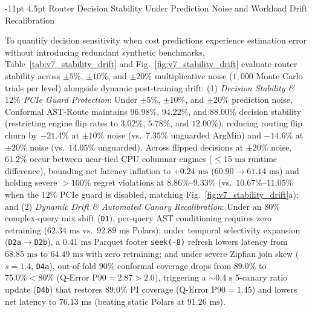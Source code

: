 \documentclass[10pt,a4paper]{article}
\makeatletter
\renewcommand\subsubsection{\@startsection{subsubsection}{3}{\z@}%
  {-11pt \@plus -2.5pt \@minus -1pt}%
  {4.5pt \@plus 1pt}%
  {\normalfont\normalsize\bfseries}}
\makeatother
\begin{document}
\subsubsection{Router Decision Stability Under Prediction Noise and Workload Drift Recalibration}

To quantify decision sensitivity when cost predictions experience estimation error without introducing redundant synthetic benchmarks, Table~\ref{tab:v7_stability_drift} and Fig.~\ref{fig:v7_stability_drift} evaluate router stability across $\pm 5\%$, $\pm 10\%$, and $\pm 20\%$ multiplicative noise ($1{,}000$ Monte Carlo trials per level) alongside dynamic post-training drift:
(1) \emph{Decision Stability \& $12\%$ PCIe Guard Protection}: Under $\pm 5\%$, $\pm 10\%$, and $\pm 20\%$ prediction noise, Conformal AST-Route maintains $96.98\%$, $94.22\%$, and $88.00\%$ decision stability (restricting engine flip rates to $3.02\%$, $\mathbf{5.78\%}$, and $\mathbf{12.00\%}$), reducing routing flip churn by $\mathbf{-21.4\%}$ at $\pm 10\%$ noise (vs.\ $7.35\%$ unguarded ArgMin) and $\mathbf{-14.6\%}$ at $\pm 20\%$ noise (vs.\ $14.05\%$ unguarded). Across flipped decisions at $\pm 20\%$ noise, $61.2\%$ occur between near-tied CPU columnar engines ($\le 15\text{ ms}$ runtime difference), bounding net latency inflation to $+0.24\text{ ms}$ ($60.90 \rightarrow 61.14\text{ ms}$) and holding severe $>100\%$ regret violations at $8.86\%\text{--}9.33\%$ (vs.\ $10.67\%\text{--}11.05\%$ when the $12\%$ PCIe guard is disabled, matching Fig.~\ref{fig:v7_stability_drift}a); and
(2) \emph{Dynamic Drift \& Automated Canary Recalibration}: Under an $80\%$ complex-query mix shift (\texttt{D1}), per-query AST conditioning requires zero retraining ($62.34\text{ ms}$ vs.\ $92.89\text{ ms}$ Polars); under temporal selectivity expansion (\texttt{D2a}$\rightarrow$\texttt{D2b}), a $0.41\text{ ms}$ Parquet footer \texttt{seek(-8)} refresh lowers latency from $68.85\text{ ms}$ to $64.49\text{ ms}$ with zero retraining; and under severe Zipfian join skew ($s=1.4$, \texttt{D4a}), out-of-fold $90\%$ conformal coverage drops from $89.0\%$ to $75.0\% < 80\%$ ($\text{Q-Error P90} = 2.87 > 2.0$), triggering a $\sim 0.4\text{ s}$ 5-canary ratio update (\texttt{D4b}) that restores $89.0\%$ PI coverage ($\text{Q-Error P90} = 1.45$) and lowers net latency to $76.13\text{ ms}$ (beating static Polars at $91.26\text{ ms}$).
\end{document}
